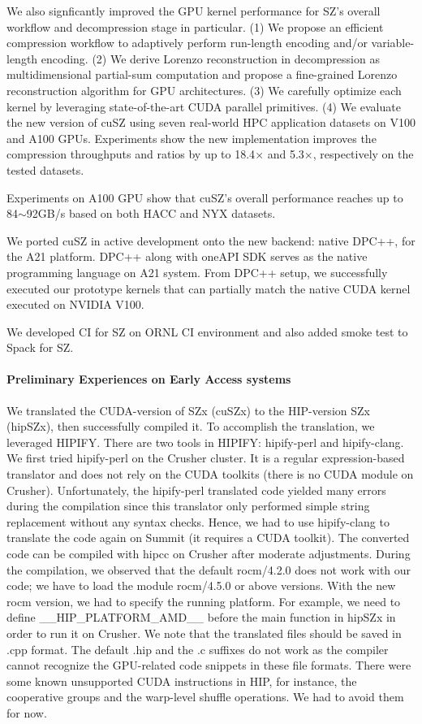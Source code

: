 We also signficantly improved the GPU kernel performance for SZ's overall workflow and decompression stage in particular. (1) We propose an efficient compression workflow to adaptively perform run-length encoding and/or variable-length encoding. (2) We derive Lorenzo reconstruction in decompression as multidimensional partial-sum computation and propose a fine-grained Lorenzo reconstruction algorithm for GPU architectures. (3) We carefully optimize each kernel by leveraging state-of-the-art CUDA parallel primitives. (4) We evaluate the new version of cuSZ using seven real-world HPC application datasets on V100 and A100 GPUs. Experiments show the new implementation improves the compression throughputs and ratios by up to 18.4$\times$ and 5.3$\times$, respectively on the tested datasets.

Experiments on A100 GPU show that cuSZ's overall performance reaches up to 84$\sim$92GB/s based on both HACC and NYX datasets.

We ported cuSZ in active development onto the new backend: native DPC++, for the A21 platform. 
DPC++ along with oneAPI SDK serves as the native programming language on A21 system. From DPC++ setup, we successfully executed our prototype kernels that can partially match the native CUDA kernel executed on NVIDIA V100.

We developed CI for SZ on ORNL CI environment and also added smoke test to Spack for SZ. 

\paragraph{Preliminary Experiences on Early Access systems}
We translated the CUDA-version of SZx (cuSZx) to the HIP-version SZx (hipSZx), then successfully compiled it. To accomplish the translation, we leveraged HIPIFY. There are two tools in HIPIFY: hipify-perl and hipify-clang. We first tried hipify-perl on the Crusher cluster. It is a regular expression-based translator and does not rely on the CUDA toolkits (there is no CUDA module on Crusher). Unfortunately, the hipify-perl translated code yielded many errors during the compilation since this translator only performed simple string replacement without any syntax checks. Hence, we had to use hipify-clang to translate the code again on Summit (it requires a CUDA toolkit). The converted code can be compiled with hipcc on Crusher after moderate adjustments. During the compilation, we observed that the default rocm/4.2.0 does not work with our code; we have to load the module rocm/4.5.0 or above versions. With the new rocm version, we had to specify the running platform. For example, we need to define \_\_HIP\_PLATFORM\_AMD\_\_ before the main function in hipSZx in order to run it on Crusher. We note that the translated files should be saved in .cpp format. The default .hip and the .c suffixes do not work as the compiler cannot recognize the GPU-related code snippets in these file formats. There were some known unsupported CUDA instructions in HIP, for instance, the cooperative groups and the warp-level shuffle operations. We had to avoid them for now.

